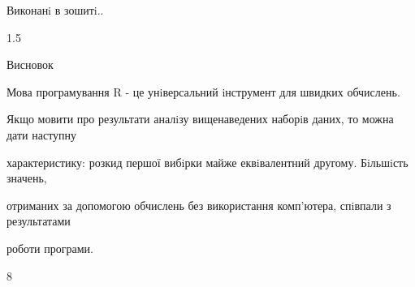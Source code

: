 \documentclass[a4paper,portrait,12pt]{article}
\begin{document}
\begin{flushleft}
Виконанi в зошитi..
\end{flushleft}





1.5





\begin{flushleft}
Висновок
\end{flushleft}





\begin{flushleft}
Мова програмування R - це унiверсальний iнструмент для швидких обчислень.
\end{flushleft}


\begin{flushleft}
Якщо мовити про результати аналiзу вищенаведених наборiв даних, то можна дати наступну
\end{flushleft}


\begin{flushleft}
характеристику: розкид першої вибiрки майже еквiвалентний другому. Бiльшiсть значень,
\end{flushleft}


\begin{flushleft}
отриманих за допомогою обчислень без використання комп'ютера, спiвпали з результатами
\end{flushleft}


\begin{flushleft}
роботи програми.
\end{flushleft}





8





\newpage
\end{document}
